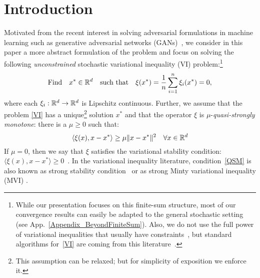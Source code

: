 \documentclass{article}
\begin{document}
\section{Introduction}
\vspace{-1mm}
Motivated from the recent interest in solving adversarial formulations in machine learning such as generative adversarial networks (GANs)~\citep{goodfellow2014generative}, we consider in this paper a more abstract formulation of the problem and focus on solving the following \emph{unconstrained} stochastic variational inequality (VI) problem:\footnote{While our presentation focuses on this finite-sum structure, most of our convergence results can easily be adapted to the general stochastic setting (see App.~\ref{Appendix_BeyondFiniteSum}). Also, we do not use the full power of variational inequalities that usually have constraints~\citep{harker1990finite}, but standard algorithms for~\eqref{VI} are coming from this literature~\citep{gidel2018variational}.}
\vspace{-3mm}
\begin{equation}
\label{VI}
\text{Find} \quad  x^* \in \mathbb{R}^d \quad \text{such that} \quad \xi(x^*)=\frac{1}{n}\sum_{i=1}^n \xi_i(x^*)=0,
\end{equation}
where each $\xi_i: \mathbb{R}^d \rightarrow \mathbb{R}^d$ is Lipschitz continuous. Further, we assume that the problem \eqref{VI} has a unique\footnote{This assumption can be relaxed; but for simplicity of exposition we enforce it.} solution $x^*$ and that the operator $\xi$ is $\mu$-\emph{quasi-strongly monotone}: there is a $\mu \geq 0$ such that:
\begin{equation}
\label{QSM}
\left\langle\xi(x),  x-x^*\right\rangle \geq \mu \|x-x^*\|^2 \quad \forall x \in \mathbb{R}^d
\end{equation} 
If $\mu=0$, then we say that $\xi$ satisfies the variational stability condition: $\langle \xi(x), x-x^*\rangle\geq 0$~\citep{hsieh2020explore}. In the variational inequality literature, condition~\eqref{QSM} is also known as strong stability condition~\citep{mertikopoulos2019games} or as strong Minty variational inequality (MVI) \citep{diakonikolas2021efficient, song2020optimistic}.
\end{document}

